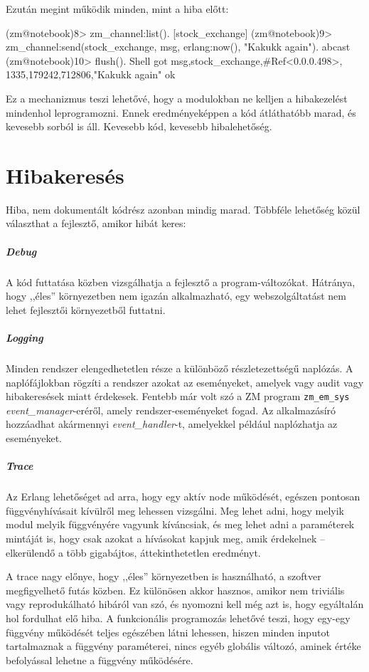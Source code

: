 \documentclass[12pt, a4paper, oneside]{book}
\begin{document}
Ezután megint működik minden, mint a hiba előtt:

\begin{code}{}{}
(zm@notebook)8> zm_channel:list().                                               
[stock_exchange]
(zm@notebook)9> zm_channel:send(stock_exchange, 
                    {msg, {erlang:now(), "Kakukk again"}}).
abcast
(zm@notebook)10> flush().                                                               
Shell got {msg,{stock_exchange,#Ref<0.0.0.498>},
               {{1335,179242,712806},"Kakukk again"}}
ok
\end{code}

Ez a mechanizmus teszi lehetővé, hogy a modulokban ne kelljen a
hibakezelést mindenhol leprogramozni. Ennek eredményeképpen a kód átláthatóbb
marad, és kevesebb sorból is áll. Kevesebb kód, kevesebb hibalehetőség. 

\section{Hibakeresés}
Hiba, nem dokumentált kódrész azonban mindig marad. Többféle lehetőség közül
választhat a fejlesztő, amikor hibát keres: 
\subparagraph{Debug} A kód futtatása közben vizsgálhatja a fejlesztő a
program-változókat. Hátránya, hogy ,,éles'' környezetben nem igazán
alkalmazható, egy webszolgáltatást nem lehet fejlesztői környezetből futtatni.
\subparagraph{Logging} Minden rendszer elengedhetetlen része a különböző
részletezettségű naplózás. A naplófájlokban rögzíti a rendszer azokat az
eseményeket, amelyek vagy audit vagy hibakeresések miatt érdekesek. Fentebb már
volt szó a ZM program \texttt{zm\_em\_sys} \emph{event\_manager}-eréről, amely
rendszer-eseményeket fogad. Az alkalmazásíró hozzáadhat akármennyi
\emph{event\_handler}-t, amelyekkel például naplózhatja az eseményeket.
\subparagraph{Trace} Az Erlang lehetőséget ad arra, hogy egy aktív node
működését, egészen pontosan függvényhívásait kívülről meg lehessen vizsgálni.
Meg lehet adni, hogy melyik modul melyik függvényére vagyunk kíváncsiak, és meg
lehet adni a paraméterek mintáját is, hogy csak azokat a hívásokat kapjuk meg,
amik érdekelnek -- elkerülendő a több gigabájtos, áttekinthetetlen eredményt. 

A trace nagy előnye, hogy ,,éles'' környezetben is használható, a szoftver
megfigyelhető futás közben. Ez különösen akkor hasznos, amikor nem triviális
vagy reprodukálható hibáról van szó, és nyomozni kell még azt is, hogy
egyáltalán hol fordulhat elő hiba. A funkcionális programozás lehetővé teszi,
hogy egy-egy függvény működését teljes egészében látni lehessen, hiszen minden
inputot tartalmaznak a függvény paraméterei, nincs egyéb globális változó,
aminek értéke befolyással lehetne a függvény működésére.
\end{document}
